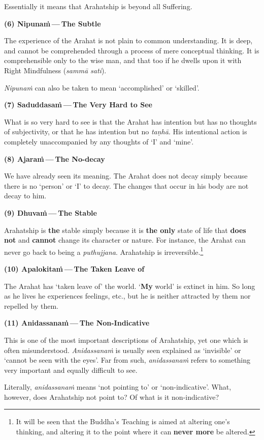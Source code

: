 \protect\hypertarget{beyond}{}{}Essentially it means that Arahatship is beyond all Suffering.

\textbf{(6) Nipunaṁ --- The Subtle}

The experience of the Arahat is not plain to common understanding. It is deep, and cannot be comprehended through a process of mere conceptual thinking. It is comprehensible only to the wise man, and that too if he dwells upon it with Right Mindfulness (\emph{sammā sati}).

\emph{Nipunaṁ} can also be taken to mean `accomplished' or `skilled'.

\textbf{(7) Saduddasaṁ --- The Very Hard to See}

What is so very hard to see is that the Arahat has intention but has no thoughts of subjectivity, or that he has intention but no \emph{taṇhā}. His intentional action is completely unaccompanied by any thoughts of `I' and `mine'.

\textbf{(8) Ajaraṁ --- The No-decay}

We have already seen its meaning. The Arahat does not decay simply because there is no `person' or `I' to decay. The changes that occur in his body are not decay to him.

\textbf{(9) Dhuvaṁ --- The Stable}

Arahatship is \textbf{the} stable simply because it is \textbf{the only} state of life that \textbf{does not} and \textbf{cannot} change its character or nature. For instance, the Arahat can never go back to being a \emph{puthujjana}. Arahatship is irreversible.\footnote{It will be seen that the Buddha's Teaching is aimed at altering one's thinking, and altering it to the point where it can \textbf{never more} be altered.}

\textbf{(10) Apalokitaṁ --- The Taken Leave of}

The Arahat has `taken leave of' the world. `\textbf{My} world' is extinct in him. So long as he lives he experiences feelings, etc., but he is neither attracted by them nor repelled by them.

\textbf{(11) Anidassanaṁ --- The Non-Indicative}

This is one of the most important descriptions of Arahatship, yet one which is often misunderstood. \emph{Anidassanaṁ} is usually seen explained as `invisible' or `cannot be seen with the eyes'. Far from such, \emph{anidassanaṁ} refers to something very important and equally difficult to see.

Literally, \emph{anidassanaṁ} means `not pointing to' or `non-indicative'. What, however, does Arahatship not point to? Of what is it non-indicative?

